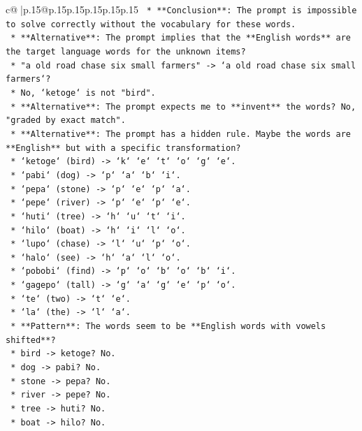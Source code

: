 \documentclass{article}
\begin{document}
{\begin{supertabular}{c@{$\;$}|p{.15\linewidth}@{}p{.15\linewidth}p{.15\linewidth}p{.15\linewidth}p{.15\linewidth}p{.15\linewidth}}
{{{\texttt{    *   **Conclusion**: The prompt is impossible to solve correctly without the vocabulary for these words.} \\
\texttt{    *   **Alternative**: The prompt implies that the **English words** are the target language words for the unknown items?} \\
\texttt{    *   "a old road chase six small farmers" {-}> `a old road chase six small farmers`?} \\
\texttt{    *   No, `ketoge` is not "bird".} \\
\texttt{    *   **Alternative**: The prompt expects me to **invent** the words? No, "graded by exact match".} \\
\texttt{    *   **Alternative**: The prompt has a hidden rule. Maybe the words are **English** but with a specific transformation?} \\
\texttt{    *   `ketoge` (bird) {-}> `k` `e` `t` `o` `g` `e`.} \\
\texttt{    *   `pabi` (dog) {-}> `p` `a` `b` `i`.} \\
\texttt{    *   `pepa` (stone) {-}> `p` `e` `p` `a`.} \\
\texttt{    *   `pepe` (river) {-}> `p` `e` `p` `e`.} \\
\texttt{    *   `huti` (tree) {-}> `h` `u` `t` `i`.} \\
\texttt{    *   `hilo` (boat) {-}> `h` `i` `l` `o`.} \\
\texttt{    *   `lupo` (chase) {-}> `l` `u` `p` `o`.} \\
\texttt{    *   `halo` (see) {-}> `h` `a` `l` `o`.} \\
\texttt{    *   `pobobi` (find) {-}> `p` `o` `b` `o` `b` `i`.} \\
\texttt{    *   `gagepo` (tall) {-}> `g` `a` `g` `e` `p` `o`.} \\
\texttt{    *   `te` (two) {-}> `t` `e`.} \\
\texttt{    *   `la` (the) {-}> `l` `a`.} \\
\texttt{    *   **Pattern**: The words seem to be **English words with vowels shifted**?} \\
\texttt{    *   bird {-}> ketoge? No.} \\
\texttt{    *   dog {-}> pabi? No.} \\
\texttt{    *   stone {-}> pepa? No.} \\
\texttt{    *   river {-}> pepe? No.} \\
\texttt{    *   tree {-}> huti? No.} \\
\texttt{    *   boat {-}> hilo? No.} \\
}}}
\end{supertabular}}
\end{document}
